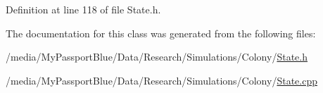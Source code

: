 \-Definition at line 118 of file \-State.\-h.



\-The documentation for this class was generated from the following files\-:\begin{DoxyCompactItemize}
\item 
/media/\-My\-Passport\-Blue/\-Data/\-Research/\-Simulations/\-Colony/\hyperlink{_state_8h}{\-State.\-h}\item 
/media/\-My\-Passport\-Blue/\-Data/\-Research/\-Simulations/\-Colony/\hyperlink{_state_8cpp}{\-State.\-cpp}\end{DoxyCompactItemize}
